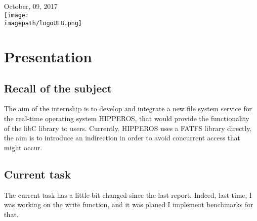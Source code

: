 \documentclass[12pt]{article}
\begin{document}
\begin{titlepage}

{\large October, 09, 2017 }\\[2cm] %



\texttt{[image: \\imagepath/logoULB.png]}\\[1cm] 
 

\vfill %

\end{titlepage}

\newpage


\pagestyle{fancy}
\fancyhf{}
\setlength\headheight{15pt}
\fancyhead[R]{}
\fancyfoot[R]{\thepage}

\newpage

\section{Presentation}
\subsection{Recall of the subject}
The aim of the internship is to develop and integrate a new file system 
service for the real-time operating system HIPPEROS, 
that would provide the functionality of the libC library to users.
Currently, HIPPEROS uses a FATFS library directly, the aim is to introduce an indirection in order to 
avoid concurrent access that might occur.

\subsection{Current task}
The current task has a little bit changed since the last report.
Indeed, last time, I was working on the write function, and it was planed 
I implement benchmarks for that.
\end{document}
